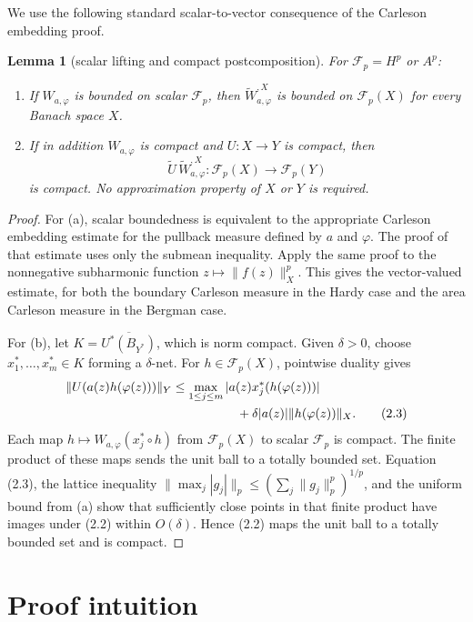 \documentclass[11pt]{article}
\newtheorem{lemma}[theorem]{Lemma}
\theoremstyle{remark}
\newcommand{\F}{\mathcal F}
\newcommand{\wa}[1]{W_{#1,\varphi}}
\begin{document}
We use the following standard scalar-to-vector consequence of the Carleson
embedding proof.

\begin{lemma}[scalar lifting and compact postcomposition]\label{lem:lift}
For $\F_p=H^p$ or $A^p$:
\begin{enumerate}[label=\textup{(\alph*)}]
\item If $\wa a$ is bounded on scalar $\F_p$, then
$\widetilde W_{a,\varphi}^{,X}$ is bounded on $\F_p(X)$ for every Banach
space $X$.
\item If in addition $\wa a$ is compact and $U:X\to Y$ is compact, then
\[
 \widetilde U\,\widetilde W_{a,\varphi}^{,X}:
 \F_p(X)\longrightarrow\F_p(Y)
 \tag{2.2}
\]
is compact.  No approximation property of $X$ or $Y$ is required.
\end{enumerate}
\end{lemma}

\begin{proof}
For (a), scalar boundedness is equivalent to the appropriate Carleson
embedding estimate for the pullback measure defined by $a$ and $\varphi$.
The proof of that estimate uses only the submean inequality.  Apply the same
proof to the nonnegative subharmonic function
$z\mapsto\|f(z)\|_X^p$.  This gives the vector-valued estimate, for both the
boundary Carleson measure in the Hardy case and the area Carleson measure in
the Bergman case.

For (b), let $K=\overline{U^*(B_{Y^*})}$, which is norm compact.  Given
$\delta>0$, choose $x_1^*,\ldots,x_m^*\in K$ forming a $\delta$-net.  For
$h\in\F_p(X)$, pointwise duality gives
\begin{align*}
 \|U(a(z)h(\varphi(z)))\|_Y
 &\leq \max_{1\leq j\leq m}
 |a(z)x_j^*(h(\varphi(z)))|\\
 &\hspace{18mm}+\delta |a(z)|\|h(\varphi(z))\|_X.
 \tag{2.3}
\end{align*}
Each map
$h\mapsto \wa a(x_j^*\circ h)$ from $\F_p(X)$ to scalar $\F_p$ is compact.
The finite product of these maps sends the unit ball to a totally bounded
set.  Equation (2.3), the lattice inequality
$\|\max_j|g_j|\|_p\leq(\sum_j\|g_j\|_p^p)^{1/p}$, and the uniform bound from
(a) show that sufficiently close points in that finite product have images
under (2.2) within $O(\delta)$.  Hence (2.2) maps the unit ball to a totally
bounded set and is compact.
\end{proof}

\section{Proof intuition}
\end{document}
